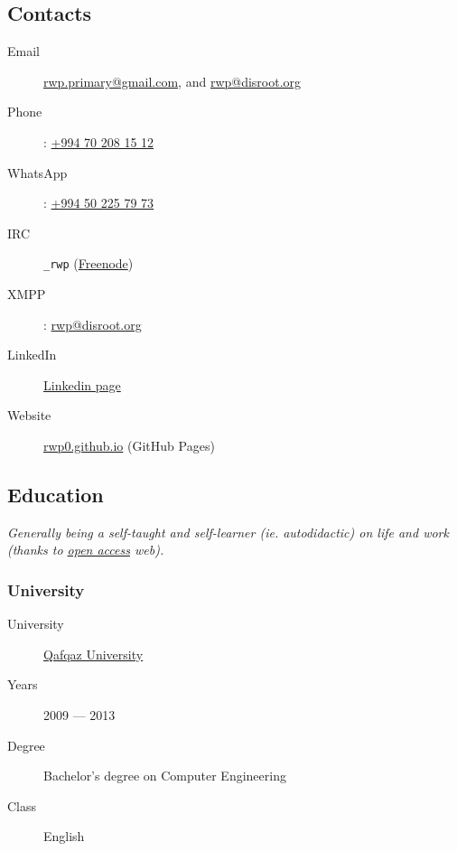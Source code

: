 \documentclass {article}
\begin{document}
    \subsection{Contacts}
    \begin{description}
        \item[Email] \href{mailto:rwp.primary@gmail.com}{rwp.primary@gmail.com}, and \href{mailto:rwp@disroot.org}{rwp@disroot.org}
        \item[Phone]: \href{tel:+994702081512}{+994 70 208 15 12}
        \item[WhatsApp]: \href{tel:+994502257973}{+994 50 225 79 73}
        \item[IRC] \verb|_rwp| (\href{https://freenode.net/}{Freenode})
        \item[XMPP]: \url{rwp@disroot.org}
        \item[LinkedIn] \href{https://linkedin.com/in/rwp0/}{Linkedin page}
        \item[Website] \href{https://rwp0.github.io/}{rwp0.github.io} (GitHub Pages)
    \end{description}

    \subsection {Education}
    \textit {Generally being a self-taught and self-learner (ie. autodidactic) on life and work (thanks to \href{https://en.wikipedia.org/wiki/Open_access}{open access} web).}

    \subsubsection {University}
    \begin {description}
        \item [University] \href {https://en.wikipedia.org/wiki/Qafqaz_University} {Qafqaz University}
        \item [Years] 2009 --- 2013
        \item [Degree] Bachelor's degree on Computer Engineering
        \item [Class] English
    \end {description}
\end{document}
